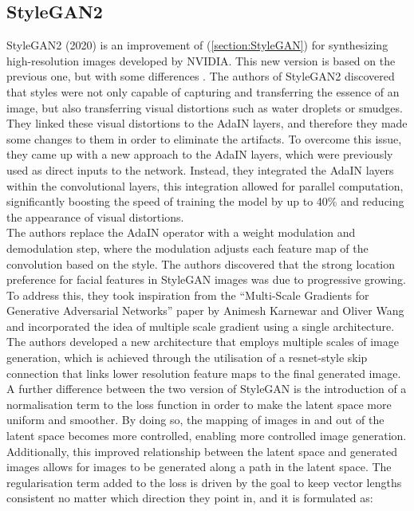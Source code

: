 \subsection{StyleGAN2}
\label{section:StyleGAN2}
StyleGAN2 (2020) is an improvement of (\ref{section:StyleGAN}) for synthesizing high-resolution images developed by NVIDIA. This new version is based on the previous one, but with some differences \cite{Karras2019stylegan2}.
The authors of StyleGAN2 discovered that styles were not only capable of capturing and transferring the essence of an image, but also transferring visual distortions such as water droplets or smudges.
They linked these visual distortions to the AdaIN layers, and therefore they made some changes to them in order to eliminate the artifacts. To overcome this issue, they came up with a new approach to the AdaIN layers, which were previously used as direct inputs to the network. Instead, they integrated the AdaIN layers within the convolutional layers, this integration allowed for parallel computation, significantly boosting the speed of training the model by up to 40\% and reducing the appearance of visual distortions. \\
The authors replace the AdaIN operator with a weight modulation and demodulation step, where the modulation adjusts each feature map of the convolution based on the style. 
The authors discovered that the strong location preference for facial features in StyleGAN images was due to progressive growing. To address this, they took inspiration from the “Multi-Scale Gradients for Generative Adversarial Networks” paper by Animesh Karnewar and Oliver Wang \cite{karnewar2019msg} and incorporated the idea of multiple scale gradient using a single architecture. The authors developed a new architecture that employs multiple scales of image generation, which is achieved through the utilisation of a resnet-style skip connection that links lower resolution feature maps to the final generated image.
A further difference between the two version of StyleGAN is the introduction of a normalisation term to the loss function in order to make the latent space more uniform and smoother. By doing so, the mapping of images in and out of the latent space becomes more controlled, enabling more controlled image generation. Additionally, this improved relationship between the latent space and generated images allows for images to be generated along a path in the latent space. The regularisation term added to the loss is driven by the goal to keep vector lengths consistent no matter which direction they point in, and it is formulated as:
